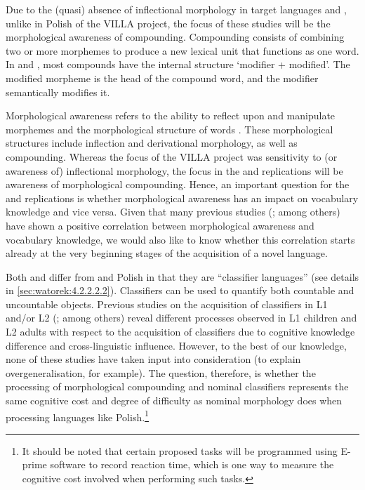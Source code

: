 \documentclass[output=paper,colorlinks,citecolor=brown,modfonts,nonflat]{../langscibook}
\begin{document}
Due to the (quasi) absence of inflectional morphology in target languages  and , unlike in Polish of the VILLA project, the focus of these studies will be the morphological awareness of compounding. Compounding consists of combining two or more morphemes to produce a new lexical unit that functions as one word. In  and , most compounds have the internal structure ‘modifier + modified’. The modified morpheme is the head of the compound word, and the modifier semantically modifies it.

Morphological awareness refers to the ability to reflect upon and manipulate morphemes and the morphological structure of words \citep{Carlisle2003}. These morphological structures include inflection and derivational morphology, as well as compounding. Whereas the focus of the VILLA project was sensitivity to (or awareness of) inflectional morphology, the focus in the  and  replications will be awareness of morphological compounding. Hence, an important question for the  and  replications is whether morphological awareness has an impact on vocabulary knowledge and vice versa. Given that many previous studies (\citealt{KuAnderson2003,ZhangKoda2014,Ichikawa2014,ZhangEtAl2016}; among others) have shown a positive correlation between morphological awareness and vocabulary knowledge, we would also like to know whether this correlation starts already at the very beginning stages of the acquisition of a novel language.

\largerpage[2]
Both  and  differ from  and Polish in that they are “classifier languages” (see details in \ref{sec:watorek:4.2.2.2.2}). Classifiers can be used to quantify both countable and uncountable objects. Previous studies on the acquisition of classifiers in L1 and/or L2  (\citealt{Liang2008,Gong2010,Kong2012}; among others) reveal different processes observed in L1 children and L2 adults with respect to the acquisition of classifiers due to cognitive knowledge difference and cross-linguistic influence. However, to the best of our knowledge, none of these studies have taken input into consideration (to explain overgeneralisation, for example). The question, therefore, is whether the processing of morphological compounding and nominal classifiers represents the same cognitive cost and degree of difficulty as nominal morphology does when processing languages like Polish.{\footnote{It should be noted that certain proposed tasks will be programmed using E-prime software to record reaction time, which is one way to measure the cognitive cost involved when performing such tasks.}}
\end{document}
